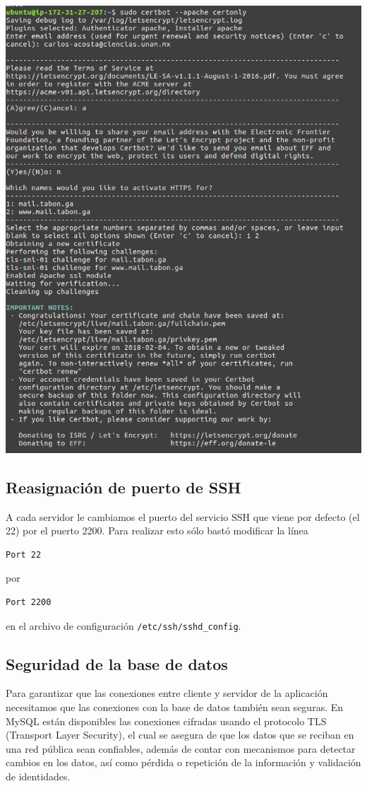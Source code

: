 \documentclass[12pt]{article}
\begin{document}
\begin{center}
\includegraphics[scale=0.3]{mail/2}
\end{center}

\subsection{Reasignación de puerto de SSH}
A cada servidor le cambiamos el puerto del servicio \textsf{SSH} que viene por defecto (el 22) por el puerto 2200. Para realizar esto sólo bastó modificar la línea
\begin{verbatim}
Port 22
\end{verbatim}
por
\begin{verbatim}
Port 2200
\end{verbatim}
en el archivo de configuración \texttt{/etc/ssh/sshd\_config}.

\subsection{Seguridad de la base de datos}
Para garantizar que las conexiones entre cliente y servidor de la aplicación necesitamos que las conexiones con la base de datos también sean seguras. En \textsf{MySQL} están disponibles las conexiones cifradas usando el protocolo \textsf{TLS} (Transport Layer Security), el cual se asegura de que los datos que se reciban en una red pública sean confiables, además de contar con mecanismos para detectar cambios en los datos, así como pérdida o repetición de la información y validación de identidades. \\
\end{document}
